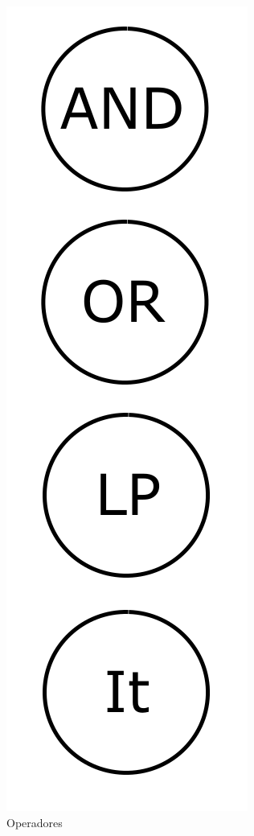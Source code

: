 \begin{figure}[h!]
    \centering
        \includegraphics[scale=0.20]{Proyecto Integrador Figuras/18 Operadores.png}
        \caption{Operadores}
\end{figure}

